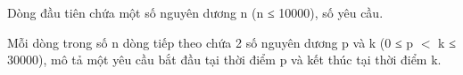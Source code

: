 Dòng đầu tiên chứa một số nguyên dương n (n ≤ 10000), số yêu cầu.  

   Mỗi dòng trong số n dòng tiếp theo chứa 2 số nguyên dương p và k (0 ≤ p $<$ k ≤ 30000), mô tả một yêu cầu bắt đầu tại thời điểm p và kết thúc tại thời điểm k.